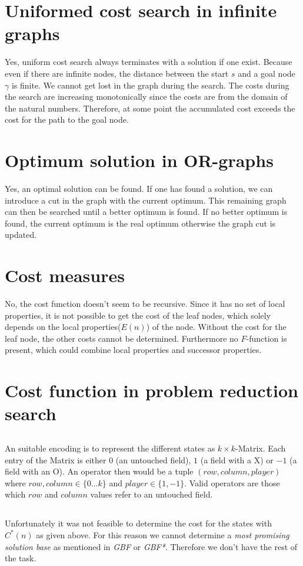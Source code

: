 \documentclass[11pt]{article}
\begin{document}
\setcounter{section}{2}
\section{Uniformed cost search in infinite graphs}
Yes, uniform cost search always terminates with a solution if one exist. Because even if there are infinite nodes, the distance between the start $s$ and a goal node $\gamma$ is finite. We cannot get lost in the graph during the search. The costs during the search are increasing monotonically since the costs are from the domain of the natural numbers. Therefore, at some point the accumulated cost exceeds the cost for the path to the goal node.

\section{Optimum solution in OR-graphs}
Yes, an optimal solution can be found. If one has found a solution, we can introduce a cut in the graph with the current optimum. This remaining graph can then be searched until a better optimum is found. If no better optimum is found, the current optimum is the real optimum otherwise the graph cut is updated.

\section{Cost measures}
No, the cost function doesn't seem to be recursive. Since it has no set of local properties, it is not possible to get the cost of the leaf nodes, which solely depends on the local properties($E(n)$) of the node. Without the cost for the leaf node, the other costs cannot be determined. Furthermore no $F$-function is present, which could combine local properties and successor properties.


\section{Cost function in problem reduction search}
\subsection{}
An suitable encoding is to represent the different states as $k\times k$-Matrix. Each entry of the Matrix is either $0$ (an untouched field), $1$ (a field with a X) or $-1$ (a field with an O). An operator then would be a tuple $(row,column,player)$ where $row,column \in \{0\dots k\}$ and $player \in \{1,-1\}$. Valid operators are those which $row$ and $column$ values refer to an untouched field.

\subsection{}
Unfortunately it was not feasible to determine the cost for the states with $C^*(n)$ as given above. For this reason we cannot determine a \emph{most promising solution base} as mentioned in \emph{GBF} or \emph{GBF*}. Therefore we don't have the rest of the task.
\end{document}
